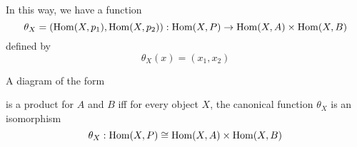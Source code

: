 \documentclass[11pt]{article}
\begin{document}
In this way, we have a function
\begin{equation*}
\theta_X=(\operatorname{Hom}(X,p_1),\operatorname{Hom}(X,p_2)):\operatorname{Hom}(X,P)\to\operatorname{Hom}(X,A)\times\operatorname{Hom}(X,B)
\end{equation*}
defined by
\begin{equation*}
\theta_X(x)=(x_1,x_2)
\end{equation*}
\begin{proposition}[]
A diagram of the form
\begin{center}\end{center}
is a product for \(A\) and \(B\) iff for every object \(X\), the canonical
function \(\theta_X\) is an isomorphism
\begin{equation*}
\theta_X:\operatorname{Hom}(X,P)\cong\operatorname{Hom}(X,A)\times\operatorname{Hom}(X,B)
\end{equation*}
\end{proposition}
\end{document}
